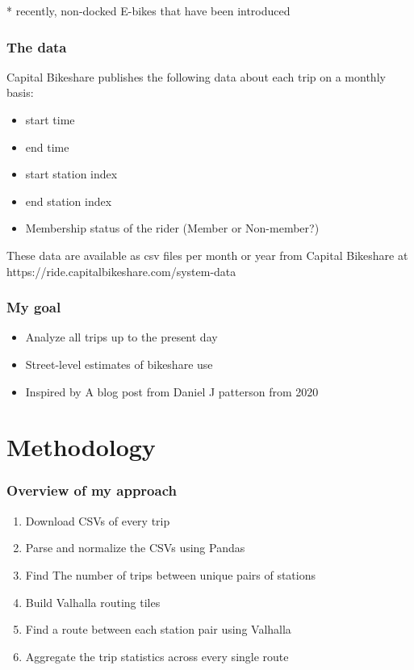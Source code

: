 \documentclass{beamer}
\begin{document}
\begin{frame}
\begin{columns}
    \end{columns}
    \small{* recently, non-docked E-bikes that have been introduced}
\end{frame}

\begin{frame}
    \frametitle{The data}

    Capital Bikeshare publishes the following data about each trip on a monthly basis:

    \begin{itemize}
        \item start time
        \item end time
        \item start station index
        \item end station index
        \item Membership status of the rider (Member or Non-member?)
    \end{itemize}

    These data are available as csv files per month or year from Capital Bikeshare at https://ride.capitalbikeshare.com/system-data
\end{frame}

\begin{frame}
    \frametitle{My goal}

    \begin{itemize}
        \item Analyze all trips up to the present day
        \item Street-level estimates of bikeshare use
        \item Inspired by A blog post from Daniel J patterson from 2020
    \end{itemize}

\end{frame}

\section{Methodology}
\begin{frame}
    \frametitle{Overview of my approach}
    \begin{enumerate}
        \item Download CSVs of every trip
        \item Parse and normalize the CSVs using Pandas
        \item Find The number of trips between unique pairs of stations
        \item Build Valhalla routing tiles 
        \item Find a route between each station pair using Valhalla
        \item Aggregate the trip statistics across every single route
    \end{enumerate}
\end{frame}
\end{document}
